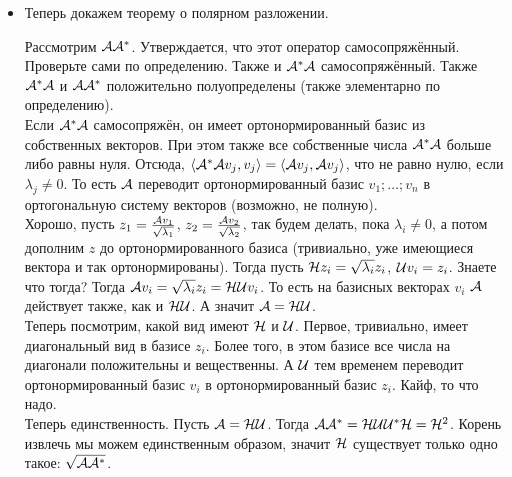 \documentclass{article}
\begin{document}
\begin{itemize}
\begin{Proof}
            Теперь единственность. Пусть есть ещё один такой: $C$. Рассмотрим $\scriptA$. Он равен $\sum\limits_\lambda\lambda\scriptP_\lambda$. И поскольку $C$ --- о.п.с., $\sum\limits_\mu\mu\scriptQ_\mu$. Поскольку $\scriptQ_\mu$ --- проекторы, если возвести сумму в квадрат, получится $\scriptA=\scriptC^2=\sum\limits_\mu\mu^2\scriptQ_\mu$. В силу единственности спектрального разложения, это равно $\sum\limits_\lambda\lambda\scriptP_\lambda$. А отсюда $Q_\mu=P_\lambda$ и $\mu^2=\lambda$. Кажется, это всё-таки $\scriptB$.
        \end{Proof}
        \item[] Теперь докажем теорему о полярном разложении.
        \begin{Proof}
            Рассмотрим ${\mathcal{A}}{\mathcal{A}}^*$. Утверждается, что этот оператор самосопряжённый. Проверьте сами по определению. Также и ${\mathcal{A}}^*{\mathcal{A}}$ самосопряжённый. Также ${\mathcal{A}}^*{\mathcal{A}}$ и ${\mathcal{A}}{\mathcal{A}}^*$ положительно полуопределены (также элементарно по определению).\\
            Если ${\mathcal{A}}^*{\mathcal{A}}$ самосопряжён, он имеет ортонормированный базис из собственных векторов. При этом также все собственные числа ${\mathcal{A}}^*{\mathcal{A}}$ больше либо равны нуля. Отсюда, ${\left\langle{{\mathcal{A}}^*{\mathcal{A}}v_j},{v_j}\right\rangle}={\left\langle{{\mathcal{A}}v_j},{{\mathcal{A}} v_j}\right\rangle}$, что не равно нулю, если $\lambda_j\neq0$. То есть $\scriptA$ переводит ортонормированный базис $v_1;\ldots;v_n$ в ортогональную систему векторов (возможно, не полную).\\
            Хорошо, пусть $z_1=\frac{{\mathcal{A}} v_1}{\sqrt{\lambda_1}}$, $z_2=\frac{{\mathcal{A}} v_2}{\sqrt{\lambda_2}}$, так будем делать, пока $\lambda_i\neq0$, а потом дополним $z$ до ортонормированного базиса (тривиально, уже имеющиеся вектора и так ортонормированы). Тогда пусть
            ${\mathcal{H}} z_i=\sqrt{\lambda_i}z_i$, ${\mathcal{U}} v_i=z_i$. Знаете что тогда? Тогда ${\mathcal{A}} v_i=\sqrt{\lambda_i}z_i={\mathcal{H}}{\mathcal{U}} v_i$. То есть на базисных векторах $v_i$ $\scriptA$ действует также, как и ${\mathcal{H}}{\mathcal{U}}$. А значит ${\mathcal{A}}={\mathcal{H}}{\mathcal{U}}$.\\
            Теперь посмотрим, какой вид имеют ${\mathcal{H}}$ и ${\mathcal{U}}$. Первое, тривиально, имеет диагональный вид в базисе $z_i$. Более того, в этом базисе все числа на диагонали положительны и вещественны. А ${\mathcal{U}}$ тем временем переводит ортонормированный базис $v_i$ в ортонормированный базис $z_i$. Кайф, то что надо.\\
            Теперь единственность. Пусть ${\mathcal{A}}={\mathcal{H}}{\mathcal{U}}$. Тогда ${\mathcal{A}}{\mathcal{A}}^*={\mathcal{H}}{\mathcal{U}}{\mathcal{U}}^*{\mathcal{H}}={\mathcal{H}}^2$. Корень извлечь мы можем единственным образом, значит ${\mathcal{H}}$ существует только одно такое: $\sqrt{{\mathcal{A}}{\mathcal{A}}^*}$.\\

\end{Proof}
\end{itemize}
\end{document}
